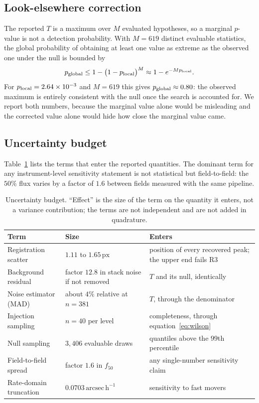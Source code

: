 \documentclass[11pt,a4paper]{article}
\newcommand{\unit}[1]{\,\mathrm{#1}}
\newcommand{\arcsec}{\unit{arcsec}}
\newcommand{\px}{\unit{px}}
\begin{document}
\subsection{Look-elsewhere correction}
The reported $T$ is a maximum over $M$ evaluated hypotheses, so a marginal
$p$-value is not a detection probability. With $M=619$ distinct evaluable
statistics, the global probability of obtaining at least one value as extreme as
the observed one under the null is bounded by
\begin{equation}
p_{\rm global} \le 1 - \big(1 - p_{\rm local}\big)^{M}
\approx 1 - e^{-M p_{\rm local}} .
\label{eq:lookelsewhere}
\end{equation}
For $p_{\rm local} = 2.64\times10^{-3}$ and $M = 619$ this gives
$p_{\rm global}\approx 0.80$: the observed maximum is entirely consistent with the
null once the search is accounted for. We report both numbers, because the
marginal value alone would be misleading and the corrected value alone would hide
how close the marginal value came.

\subsection{Uncertainty budget}
Table~\ref{tab:budget} lists the terms that enter the reported quantities. The
dominant term for any instrument-level sensitivity statement is not statistical
but field-to-field: the $50\%$ flux varies by a factor of $1.6$ between fields
measured with the same pipeline.

\begin{table}[htbp]
\centering
\small
\caption{Uncertainty budget. ``Effect'' is the size of the term on the quantity it
enters, not a variance contribution; the terms are not independent and are not
added in quadrature.}
\label{tab:budget}
\begin{tabular}{p{}p{}p{}}
\toprule
Term & Size & Enters \\
\midrule
Registration scatter & $1.11$ to $1.65\px$ & position of every recovered peak; the upper end fails R3 \\
Background residual & factor $12.8$ in stack noise if not removed & $T$ and its null, identically \\
Noise estimator (MAD) & about $4\%$ relative at $n=381$ & $T$, through the denominator \\
Injection sampling & $n=40$ per level & completeness, through equation~\eqref{eq:wilson} \\
Null sampling & $3{,}406$ evaluable draws & quantiles above the $99$th percentile \\
Field-to-field spread & factor $1.6$ in $f_{50}$ & any single-number sensitivity claim \\
Rate-domain truncation & $0.0703\arcsec\unit{h}^{-1}$ & sensitivity to fast movers \\
\bottomrule
\end{tabular}
\end{table}
\end{document}
